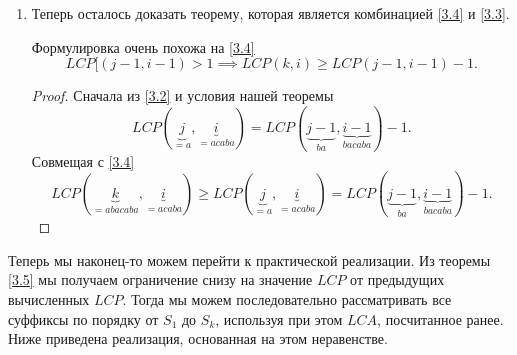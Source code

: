 \begin{enumerate}
\begin{proof}
                        Теперь заметим, что
                        \[
                                \underbrace{Suf^{-1}[k]}_{=abacaba} = \underbrace{Suf^{-1}[i]}_{=acaba} - 1     
                        .\] 
                        Т.е. мы берём предыдущий суффикс в $Suf$ перед $acaba$. Тогда получаем
                        \[
                                \underbrace{Suf^{-1}[j]}_{=a} \leq \underbrace{Suf^{-1}[k]}_{=abacaba} 
                                < \underbrace{Suf^{-1}[i]}_{=acaba}
                        .\] 
                        И наконец из \ref{3.1}
                        \[
                                LCP(\underbrace{j}_{=a}, \underbrace{i}_{=acaba}) \leq 
                                LCP(\underbrace{k}_{=abacaba}, \underbrace{i}_{=acaba})
                        .\] 
                \end{proof} 
        \item Теперь осталось доказать теорему, которая является комбинацией \ref{3.4} и \ref{3.3}. 
                \begin{theorem}[]
                        \label{3.5}
                        Формулировка очень похожа на \ref{3.4}
                        \[
                                LCP[(j-1, i-1) > 1 \implies LCP(k, i) \geq LCP(j-1, i-1) - 1
                        .\]          
                \end{theorem}
                \begin{proof}
                        Сначала из \ref{3.2} и условия нашей теоремы
                        \[
                                LCP(\underbrace{j}_{=a}, \underbrace{i}_{=acaba}) = 
                                LCP(\underbrace{j-1}_{ba}, \underbrace{i-1}_{bacaba}) - 1
                        .\] 
                        Совмещая с \ref{3.4}
                        \[
                                LCP(\underbrace{k}_{=abacaba}, \underbrace{i}_{=acaba}) 
                                \geq LCP(\underbrace{j}_{=a}, \underbrace{i}_{=acaba}) =
                                LCP(\underbrace{j-1}_{ba}, \underbrace{i-1}_{bacaba}) - 1
                        .\] 
                \end{proof}
\end{enumerate}

Теперь мы наконец-то можем перейти к практической реализации. Из теоремы \ref{3.5} мы получаем ограничение
снизу на значение $LCP$ от предыдущих вычисленных $LCP$. Тогда мы можем последовательно рассматривать
все суффиксы по порядку от $S_1$ до $S_{k}$, используя при этом $LCA$, посчитанное ранее. Ниже приведена
реализация, основанная на этом неравенстве.

